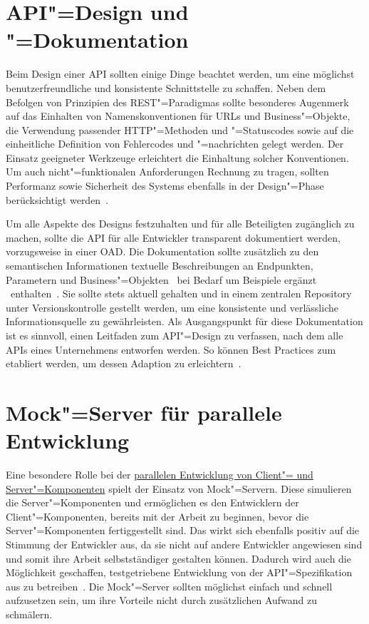 \section{API"=Design und "=Dokumentation}
Beim Design einer \ac{API} sollten einige Dinge beachtet werden, um eine möglichst benutzerfreundliche und konsistente Schnittstelle zu schaffen.
Neben dem Befolgen von Prinzipien des \ac{REST}"=Paradigmas sollte besonderes Augenmerk auf das Einhalten von Namenskonventionen für \acp{URL} und Business"=Objekte, die Verwendung passender \ac{HTTP}"=Methoden und "=Statuscodes sowie auf die einheitliche Definition von Fehlercodes und "=nachrichten gelegt werden.
Der Einsatz geeigneter Werkzeuge erleichtert die Einhaltung solcher Konventionen.
Um auch nicht"=funktionalen Anforderungen Rechnung zu tragen, sollten Performanz sowie Sicherheit des Systems ebenfalls in der Design"=Phase berücksichtigt werden~\cite[352\psq,354,360]{de23}.

Um alle Aspekte des Designs festzuhalten und für alle Beteiligten zugänglich zu machen, sollte die \ac{API} für alle Entwickler transparent dokumentiert werden, vorzugsweise in einer \ac{OAD}.
Die Dokumentation sollte zusätzlich zu den semantischen Informationen textuelle Beschreibungen an Endpunkten, Parametern und Business"=Objekten \textendash\ bei Bedarf um Beispiele ergänzt \textendash\ enthalten~\cite[353]{de23}.
Sie sollte stets aktuell gehalten und in einem zentralen Repository unter Versionskontrolle gestellt werden, um eine konsistente und verlässliche Informationsquelle zu gewährleisten.
Als Ausgangspunkt für diese Dokumentation ist es sinnvoll, einen Leitfaden zum \ac{API}"=Design zu verfassen, nach dem alle \acp{API} eines Unternehmens entworfen werden.
So können \foreignlanguage{american}{Best Practices} zum \AFA etabliert werden, um dessen Adaption zu erleichtern~\cites[3\psq]{kul23}[359]{de23}.

\section{Mock"=Server für parallele Entwicklung}
\label{sec:mock-server}
Eine besondere Rolle bei der \hyperref[sec:parallel-dev]{parallelen Entwicklung von Client"= und Server"=Komponenten} spielt der Einsatz von Mock"=Servern.
Diese simulieren die Server"=Komponenten und ermöglichen es den Entwicklern der Client"=Komponenten, bereits mit der Arbeit zu beginnen, bevor die Server"=Komponenten fertiggestellt sind.
Das wirkt sich ebenfalls positiv auf die Stimmung der Entwickler aus, da sie nicht auf andere Entwickler angewiesen sind und somit ihre Arbeit selbstständiger gestalten können.
Dadurch wird auch die Möglichkeit geschaffen, testgetriebene Entwicklung von der \ac{API}"=Spezifikation aus zu betreiben~\cite[351,353]{de23}.
Die Mock"=Server sollten möglichst einfach und schnell aufzusetzen sein, um ihre Vorteile nicht durch zusätzlichen Aufwand zu schmälern.